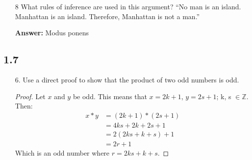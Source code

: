 \begin{itemize}
    \item[8] What rules of inference are used in this argument? “No man is an island. Manhattan is an island. Therefore, Manhattan is not a man.”

          \textbf{Answer:} Modus ponens
\end{itemize}

\subsection{1.7}
\begin{itemize}
    \item[6.] Use a direct proof to show that the product of two odd numbers is odd.
          \begin{proof}
              Let $x$ and $y$ be odd. This means that $x = 2k + 1$, $y = 2s + 1$; k, s $\in\mathbb{Z}$. \\
              Then:
              \begin{align*}
                  x*y & = (2k + 1) * (2s+1) \\
                      & = 4ks + 2k + 2s + 1 \\
                      & = 2(2ks + k + s) + 1 \\
                      & = 2r + 1
              \end{align*}
              Which is an odd number where $r = 2ks + k + s$.
          \end{proof}
\end{itemize}